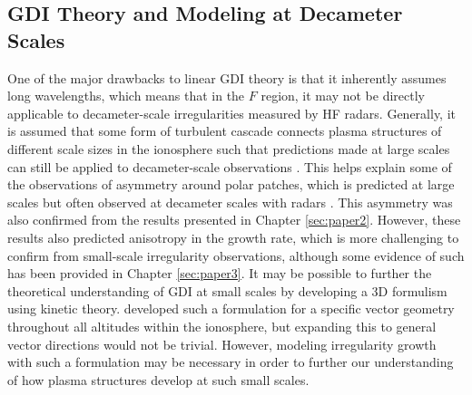 \subsection{GDI Theory and Modeling at Decameter Scales}
\label{sec:fw_gdi}
One of the major drawbacks to linear GDI theory is that it inherently assumes long wavelengths, which means that in the \(F\) region, it may not be directly applicable to decameter-scale irregularities measured by HF radars.  Generally, it is assumed that some form of turbulent cascade connects plasma structures of different scale sizes in the ionosphere such that predictions made at large scales can still be applied to decameter-scale observations \citep{Tsunoda1988}.  This helps explain some of the observations of asymmetry around polar patches, which is predicted at large scales but often observed at decameter scales with radars \citep[e.g.][]{Milan2002b,Koustov2012}.  This asymmetry was also confirmed from the results presented in Chapter \ref{sec:paper2}.  However, these results also predicted anisotropy in the growth rate, which is more challenging to confirm from small-scale irregularity observations, although some evidence of such has been provided in Chapter \ref{sec:paper3}.  It may be possible to further the theoretical understanding of GDI at small scales by developing a 3D formulism using kinetic theory.  \citet{Basu1995} developed such a formulation for a specific vector geometry throughout all altitudes within the ionosphere, but expanding this to general vector directions would not be trivial.  However, modeling irregularity growth with such a formulation may be necessary in order to further our understanding of how plasma structures develop at such small scales.

